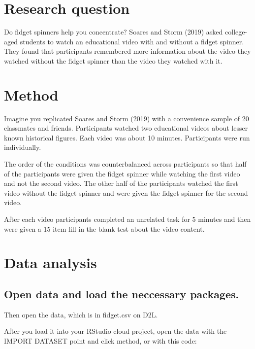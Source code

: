 \documentclass[
]{book}
\begin{document}
\hypertarget{research-question}{%
\section{Research question}\label{research-question}}

Do fidget spinners help you concentrate? Soares and Storm (2019) asked college-aged students to watch an educational video with and without a fidget spinner. They found that participants remembered more information about the video they watched without the fidget spinner than the video they watched with it.

\hypertarget{method}{%
\section{Method}\label{method}}

Imagine you replicated Soares and Storm (2019) with a convenience sample of 20 classmates and friends. Participants watched two educational videos about lesser known historical figures. Each video was about 10 minutes. Participants were run individually.

The order of the conditions was counterbalanced across participants so that half of the participants were given the fidget spinner while watching the first video and not the second video. The other half of the participants watched the first video without the fidget spinner and were given the fidget spinner for the second video.

After each video participants completed an unrelated task for 5 minutes and then were given a 15 item fill in the blank test about the video content.

\hypertarget{data-analysis-1}{%
\section{Data analysis}\label{data-analysis-1}}

\hypertarget{open-data-and-load-the-neccessary-packages.}{%
\subsection{Open data and load the neccessary packages.}\label{open-data-and-load-the-neccessary-packages.}}

Then open the data, which is in fidget.csv on D2L.

After you load it into your RStudio cloud project, open the data with the IMPORT DATASET point and click method, or with this code:
\end{document}
